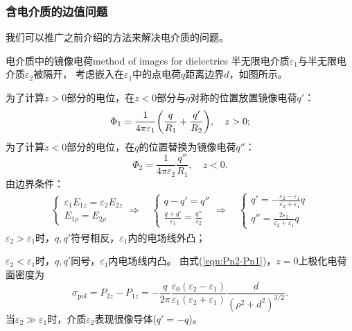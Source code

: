 \subsubsection{含电介质的边值问题}
我们可以推广之前介绍的方法来解决电介质的问题。
\begin{example}{电介质中的镜像电荷}{method of images for dielectrics}
    半无限电介质$\varepsilon_1$与半无限电介质$\varepsilon_2$被隔开，
    考虑嵌入在$\varepsilon_1$中的点电荷$q$距离边界$d$，如图所示。
    \begin{center}
    \end{center}
    为了计算$z>0$部分的电位，在$z<0$部分与$q$对称的位置放置镜像电荷$q'$：
    \[
        \Phi_1=\frac1{4\pi\varepsilon_1}\biggl(\frac q{R_1}+\frac{q'}{R_2}\biggr),\quad z>0;
    \]
    为了计算$z<0$部分的电位，在$q$的位置替换为镜像电荷$q''$：
    \[
        \Phi_2=\frac1{4\pi\varepsilon_2}\frac{q''}{R_1},\quad z<0.
    \]
    由边界条件： 
    \begin{align*}
        \begin{cases}
            \varepsilon_1E_{1z}=\varepsilon_2E_{2z}\\
            E_{1\rho}=E_{2\rho}
        \end{cases}\Rightarrow\quad
        \begin{cases}
            q-q'=q''\\
            \frac{q+q'}{\varepsilon_1}=\frac{q''}{\varepsilon_2}
        \end{cases}\Rightarrow\quad
        \begin{cases}
            q'=-\frac{\varepsilon_2-\varepsilon_1}{\varepsilon_2+\varepsilon_1}q\\[1ex]
            q''=\frac{2\varepsilon_2}{\varepsilon_2+\varepsilon_1}q
        \end{cases}
    \end{align*}
    $\varepsilon_2>\varepsilon_1$时，$q,q'$符号相反，$\varepsilon_1$内的电场线外凸；
    
    $\varepsilon_2<\varepsilon_1$时，$q,q'$同号，$\varepsilon_1$内电场线内凸。
    \tcblower 
    由式(\ref{eqn:Pn2-Pn1})，$z=0$上极化电荷面密度为
    \[
        \sigma_\text{pol}=P_{2z}-P_{1z}=-\frac q{2\pi}\frac{\varepsilon_0(\varepsilon_2-\varepsilon_1)}{\varepsilon_1(\varepsilon_2+\varepsilon_1)}\frac d{(\rho^2+d^2)^{3/2}}.
    \]
    当$\varepsilon_2\gg\varepsilon_1$时，介质$\varepsilon_2$表现很像导体($q'=-q$)。
\end{example}
